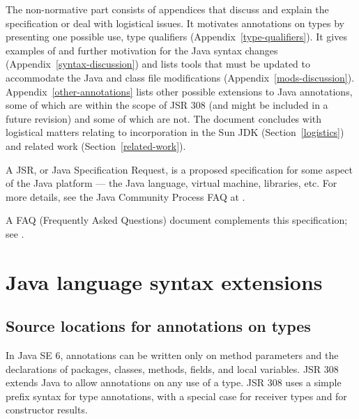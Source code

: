 \documentclass[10pt]{article}
\begin{document}
The non-normative part
consists of appendices that
discuss and explain the specification or deal with logistical issues.
It motivates annotations on types by presenting one
possible use, type qualifiers
(Appendix~\ref{type-qualifiers}).
It gives examples of and further motivation for the Java
syntax changes (Appendix~\ref{syntax-discussion}) and lists tools that
must be updated to accommodate the Java and class file
modifications (Appendix~\ref{mods-discussion}).
Appendix~\ref{other-annotations} lists other possible extensions to
Java annotations, some of which are within the scope of JSR 308 (and might
be included in a future revision) and some of which are not.
The document concludes with
logistical matters relating to
incorporation in the Sun JDK (Section~\ref{logistics})
and
related work (Section~\ref{related-work}).

A JSR, or Java Specification Request, is a proposed specification for some
aspect of the Java platform --- the Java language, virtual machine,
libraries, etc.  For more details, see the Java Community Process FAQ at
.


A FAQ (Frequently Asked Questions) document complements this specification;
see .



\section{Java language syntax extensions\label{syntax}}



\subsection{Source locations for annotations on types\label{type-annotation-locations}}

In Java SE 6, annotations can be written only on method parameters
and the declarations of packages, classes, methods, fields, and local variables.
JSR 308 extends Java to allow annotations on any use of a type.
JSR 308 uses a simple prefix syntax for type annotations, with a special case
for receiver types and for constructor results.
\end{document}
